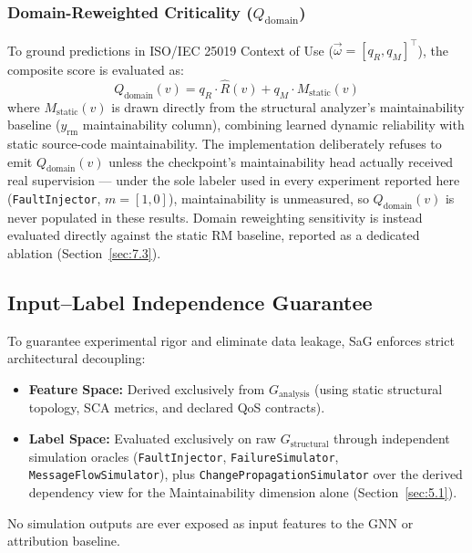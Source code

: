 \subsubsection{Domain-Reweighted Criticality (\texorpdfstring{$Q_{\text{domain}}$}{Qdomain})}

To ground predictions in ISO/IEC 25019 Context of Use ($\vec{\omega} = [q_R, q_M]^\top$), the composite score is evaluated as:
\begin{equation}
Q_{\text{domain}}(v) = q_R \cdot \hat{R}(v) + q_M \cdot M_{\text{static}}(v)
\end{equation}
where $M_{\text{static}}(v)$ is drawn directly from the structural analyzer's maintainability baseline ($y_{\text{rm}}$ maintainability column), combining learned dynamic reliability with static source-code maintainability. The implementation deliberately refuses to emit $Q_{\text{domain}}(v)$ unless the checkpoint's maintainability head actually received real supervision --- under the sole labeler used in every experiment reported here (\texttt{FaultInjector}, $m = [1, 0]$), maintainability is unmeasured, so $Q_{\text{domain}}(v)$ is never populated in these results. Domain reweighting sensitivity is instead evaluated directly against the static RM baseline, reported as a dedicated ablation (Section~\ref{sec:7.3}).

\subsection{Input--Label Independence Guarantee}
\label{sec:5.4}

To guarantee experimental rigor and eliminate data leakage, SaG enforces strict architectural decoupling:
\begin{itemize}
    \item \textbf{Feature Space:} Derived exclusively from $G_{\text{analysis}}$ (using static structural topology, SCA metrics, and declared QoS contracts).
    \item \textbf{Label Space:} Evaluated exclusively on raw $G_{\text{structural}}$ through independent simulation oracles (\texttt{FaultInjector}, \texttt{FailureSimulator}, \texttt{MessageFlowSimulator}), plus \texttt{ChangePropagationSimulator} over the derived dependency view for the Maintainability dimension alone (Section~\ref{sec:5.1}).
\end{itemize}
No simulation outputs are ever exposed as input features to the GNN or attribution baseline.
